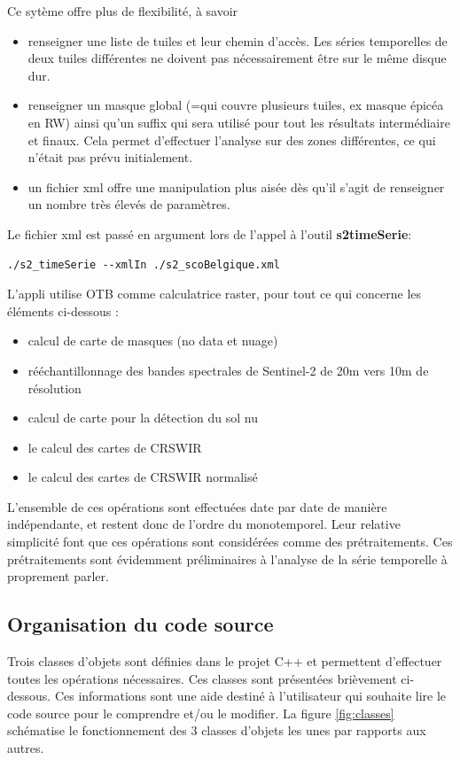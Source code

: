 \documentclass[a4paper, 12pt]{article} %
\begin{document}
Ce sytème offre plus de flexibilité, à savoir
\begin{itemize}
	\item renseigner une liste de tuiles et leur chemin d'accès. Les séries temporelles de deux tuiles différentes ne doivent pas nécessairement être sur le même disque dur.
	\item renseigner un masque global (=qui couvre plusieurs tuiles, ex masque épicéa en RW) ainsi qu'un suffix qui sera utilisé pour tout les résultats intermédiaire et finaux. Cela permet d'effectuer l'analyse sur des zones différentes, ce qui n'était pas prévu initialement.
	\item un fichier xml offre une manipulation plus aisée dès qu'il s'agit de renseigner un nombre très élevés de paramètres.
\end{itemize}

Le fichier xml est passé en argument lors de l'appel à l'outil \textbf{s2{\textunderscore}timeSerie}:
\begin{lstlisting}
./s2_timeSerie --xmlIn ./s2_scoBelgique.xml 
\end{lstlisting}

L'appli utilise OTB comme calculatrice raster, pour tout ce qui concerne les éléments ci-dessous :
\begin{itemize}
	\item calcul de carte de masques (no data et nuage)
	\item rééchantillonnage des bandes spectrales de Sentinel-2 de 20m vers 10m de résolution
	\item calcul de carte pour la détection du sol nu
	\item le calcul des cartes de CRSWIR
	\item le calcul des cartes de CRSWIR normalisé
\end{itemize}

L'ensemble de ces opérations sont effectuées date par date de manière indépendante, et restent donc de l'ordre du monotemporel. Leur relative simplicité font que ces opérations sont considérées comme des prétraitements. Ces prétraitements sont évidemment préliminaires à l'analyse de la série temporelle à proprement parler.
 
\subsection{Organisation du code source}

Trois classes d'objets sont définies dans le projet C++ et permettent d'effectuer toutes les opérations nécessaires. Ces classes sont présentées brièvement ci-dessous. Ces informations sont une aide destiné à l'utilisateur qui souhaite lire le code source pour le comprendre et/ou le modifier. La figure \ref{fig:classes} schématise le fonctionnement des 3 classes d'objets les unes par rapports aux autres.
\end{document}

